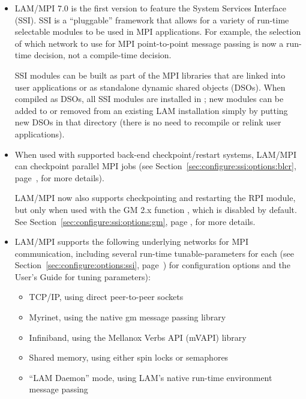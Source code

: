 \begin{itemize}
\item LAM/MPI 7.0 is the first version to feature the System Services
  Interface (SSI).  SSI is a ``pluggable'' framework that allows for a
  variety of run-time selectable modules to be used in MPI
  applications.  For example, the selection of which network to use
  for MPI point-to-point message passing is now a run-time decision,
  not a compile-time decision.
  
  
  SSI modules can be built as part of the MPI libraries that are
  linked into user applications or as standalone dynamic shared
  objects (DSOs).  When compiled as DSOs, all SSI modules are
  installed in ; new modules can be added to or
  removed from an existing LAM installation simply by putting new DSOs
  in that directory (there is no need to recompile or relink user
  applications).


\item When used with supported back-end checkpoint/restart systems,
  LAM/MPI can checkpoint parallel MPI jobs (see
  Section~\ref{sec:configure:ssi:options:blcr},
  page~\pageref{sec:configure:ssi:options:blcr}, for more details).

  
  LAM/MPI now also supports checkpointing and restarting the 
  RPI module, but only when used with the GM 2.x function
  , which is disabled by default.  See
  Section~\ref{sec:configure:ssi:options:gm}, page
  \pageref{sec:configure:ssi:options:gm}, for more details.

  
\item LAM/MPI supports the following underlying networks for MPI
  communication, including several run-time tunable-parameters for
  each (see Section~\ref{sec:configure:options:ssi},
  page~\pageref{sec:configure:options:ssi}) for configuration options
  and the User's Guide for tuning parameters):

  \begin{itemize}
  \item TCP/IP, using direct peer-to-peer sockets
  \item Myrinet, using the native gm message passing library
  \item Infiniband, using the Mellanox Verbs API (mVAPI) library
  \item Shared memory, using either spin locks or semaphores
  \item ``LAM Daemon'' mode, using LAM's native run-time environment
    message passing
  \end{itemize}
  

\end{itemize}
